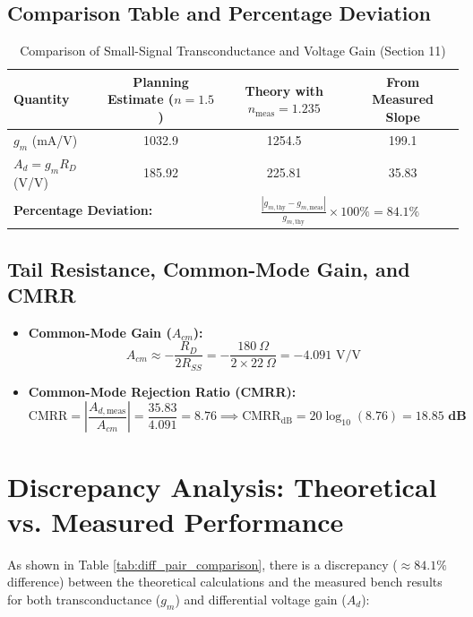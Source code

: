 \documentclass[11pt,a4paper]{article}
\begin{document}
\subsection{Comparison Table and Percentage Deviation}
\begin{table}[H]
\centering
\caption{Comparison of Small-Signal Transconductance and Voltage Gain (Section 11)}
\label{tab:comparison}
\begin{tabular}{@{}lccc@{}}
\toprule
\textbf{Quantity} & \textbf{Planning Estimate ($n = 1.5$)} & \textbf{Theory with $n_{\text{meas}} = 1.235$} & \textbf{From Measured Slope} \\ \midrule
$g_m$ (mA/V) & 1032.9 & 1254.5 & 199.1 \\
$A_d = g_m R_D$ (V/V) & 185.92 & 225.81 & 35.83 \\
\midrule
\multicolumn{2}{l}{\textbf{Percentage Deviation:}} & \multicolumn{2}{c}{$\frac{|g_{m,\text{thy}} - g_{m,\text{meas}}|}{g_{m,\text{thy}}} \times 100\% = \mathbf{84.1\%}$} \\
\bottomrule
\end{tabular}
\end{table} 

\subsection{Tail Resistance, Common-Mode Gain, and CMRR}
\begin{itemize}
    \item \textbf{Common-Mode Gain ($A_{cm}$):}
    \begin{equation}
        A_{cm} \approx -\frac{R_D}{2 R_{SS}} = -\frac{180\ \Omega}{2 \times 22\ \Omega} = -4.091\text{ V/V}
    \end{equation}
    \item \textbf{Common-Mode Rejection Ratio (CMRR):}
    \begin{equation}
        \text{CMRR} = \left|\frac{A_{d,\text{meas}}}{A_{cm}}\right| = \frac{35.83}{4.091} = \mathbf{8.76} \implies \text{CMRR}_{\text{dB}} = 20 \log_{10}(8.76) = \mathbf{18.85\text{ dB}}
    \end{equation}
\end{itemize} 

\section{Discrepancy Analysis: Theoretical vs. Measured Performance}

As shown in Table \ref{tab:diff_pair_comparison}, there is a discrepancy ($\approx 84.1\%$ difference) between the theoretical calculations and the measured bench results for both transconductance ($g_m$) and differential voltage gain ($A_d$):
\end{document}
